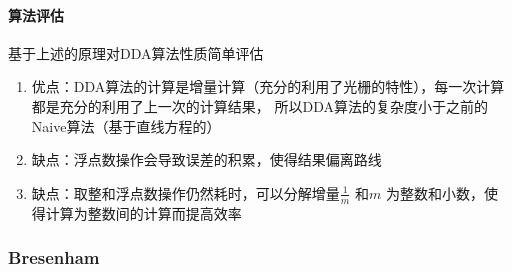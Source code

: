 \documentclass[a4paper,UTF8]{article}
\theoremstyle{definition}
\begin{document}
\paragraph{算法评估} 
基于上述的原理对DDA算法性质简单评估
\begin{enumerate}
    \item 优点：DDA算法的计算是增量计算（充分的利用了光栅的特性），每一次计算都是充分的利用了上一次的计算结果，
    所以DDA算法的复杂度小于之前的Naive算法（基于直线方程的）
    \item 缺点：浮点数操作会导致误差的积累，使得结果偏离路线
    \item 缺点：取整和浮点数操作仍然耗时，可以分解增量$\frac{1}{m}$ 和$m$ 为整数和小数，使得计算为整数间的计算而提高效率
\end{enumerate}


\subsubsection{Bresenham}
\end{document}
